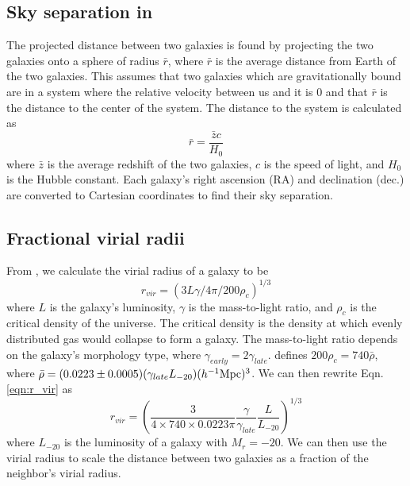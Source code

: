 \subsection{Sky separation in \hMpc}

The projected distance between two galaxies is found by projecting the two 
galaxies onto a sphere of radius $\bar{r}$, where $\bar{r}$ is the average 
distance from Earth of the two galaxies.  This assumes that two galaxies which 
are gravitationally bound are in a system where the relative velocity between us 
and it is 0 and that $\bar{r}$ is the distance to the center of the system.  The 
distance to the system is calculated as
\begin{equation}
    \bar{r} = \frac{\bar{z}c}{H_0}
\end{equation}
where $\bar{z}$ is the average redshift of the two galaxies, $c$ is the speed of 
light, and $H_0$ is the Hubble constant.  Each galaxy's right ascension (RA) and 
declination (dec.) are converted to Cartesian coordinates to find their sky 
separation.


\subsection{Fractional virial radii}

From \cite{Hwang10}, we calculate the virial radius of a galaxy to be
\begin{equation}\label{eqn:r_vir}
    r_{vir} = (3L\gamma/4\pi/200\rho_c)^{1/3}
\end{equation}
where $L$ is the galaxy's luminosity, $\gamma$ is the mass-to-light ratio, and 
$\rho_c$ is the critical density of the universe.  The critical density is the 
density at which evenly distributed gas would collapse to form a galaxy.  The 
mass-to-light ratio depends on the galaxy's morphology type, where 
$\gamma_{early} = 2\gamma_{late}$.  \cite{Hwang10} defines 
$200\rho_c = 740\bar{\rho}$, where 
$\bar{\rho} = (0.0223\pm 0.0005)(\gamma_{late}L_{-20})(\text{$h^{-1}$Mpc})^3$.  We can 
then rewrite Eqn. \ref{eqn:r_vir} as
\begin{equation}
    r_{vir} = \left( \frac{3}{4\times 740\times 0.0223\pi} \frac{\gamma}{\gamma_{late}} \frac{L}{L_{-20}} \right)^{1/3}
\end{equation}
where $L_{-20}$ is the luminosity of a galaxy with $M_r = -20$.  We can then use 
the virial radius to scale the distance between two galaxies as a fraction of 
the neighbor's virial radius.

